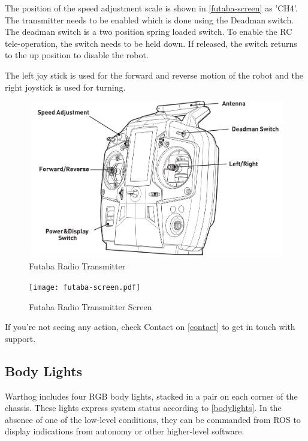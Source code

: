 \documentclass[]{clearpath-latex/clearpath-manual}
\begin{document}
The position of the speed adjustment scale is shown in \autoref{futaba-screen} as 'CH4'.
The transmitter needs to be enabled which is done using the Deadman switch.  The deadman switch is a two position spring loaded switch.  To enable the RC tele-operation, the switch needs to be held down.  If released, the switch returns to the up position to disable the robot.

The left joy stick is used for the forward and reverse motion of the robot and the right joystick is used for turning.

\begin{figure}[!h]
  \centering
  \includegraphics[width=1.0\linewidth]{graphics/futaba.png}
  \caption{Futaba Radio Transmitter}
  \label{futaba}
\end{figure}

\begin{figure}[!h]
  \centering
  \texttt{[image: futaba-screen.pdf]}
  \caption{Futaba Radio Transmitter Screen}
  \label{futaba-screen}
\end{figure}

If you’re not seeing any action, check Contact on \autoref{contact} to get in touch with support.


\pagebreak[4]

\subsection{Body Lights}

Warthog includes four RGB body lights, stacked in a pair on each corner of the chassis. These lights express system status according to \autoref{bodylights}. In the absence of one of the low-level conditions, they can be commanded from ROS to display indications from autonomy or other higher-level software.
\end{document}
